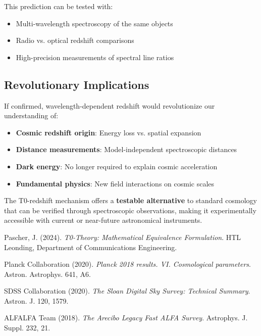 \documentclass[12pt,a4paper]{article}
\theoremstyle{definition}
\begin{document}
	This prediction can be tested with:
	\begin{itemize}
		\item Multi-wavelength spectroscopy of the same objects
		\item Radio vs. optical redshift comparisons
		\item High-precision measurements of spectral line ratios
	\end{itemize}
	
	\subsection{Revolutionary Implications}
	
	\begin{important}
		If confirmed, wavelength-dependent redshift would revolutionize our understanding of:
		\begin{itemize}
			\item \textbf{Cosmic redshift origin}: Energy loss vs. spatial expansion
			\item \textbf{Distance measurements}: Model-independent spectroscopic distances
			\item \textbf{Dark energy}: No longer required to explain cosmic acceleration
			\item \textbf{Fundamental physics}: New field interactions on cosmic scales
		\end{itemize}
	\end{important}
	
	The T0-redshift mechanism offers a \textbf{testable alternative} to standard cosmology that can be verified through spectroscopic observations, making it experimentally accessible with current or near-future astronomical instruments.
	
	
	\begin{thebibliography}{9}
		
		Pascher, J. (2024). \textit{T0-Theory: Mathematical Equivalence Formulation}. HTL Leonding, Department of Communications Engineering.
		
		Planck Collaboration (2020). \textit{Planck 2018 results. VI. Cosmological parameters}. Astron. Astrophys. 641, A6.
		
		SDSS Collaboration (2020). \textit{The Sloan Digital Sky Survey: Technical Summary}. Astron. J. 120, 1579.
		
		ALFALFA Team (2018). \textit{The Arecibo Legacy Fast ALFA Survey}. Astrophys. J. Suppl. 232, 21.
		
	\end{thebibliography}
	
\end{document}
